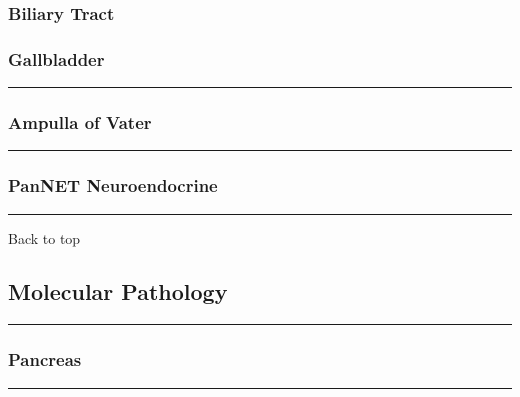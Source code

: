 \documentclass[]{article}
\begin{document}
\hypertarget{biliary-tract-1}{%
\subsubsection{Biliary Tract}\label{biliary-tract-1}}

\hypertarget{gallbladder-1}{%
\subsubsection{Gallbladder}\label{gallbladder-1}}

\begin{center}\rule{0.5\linewidth}{\linethickness}\end{center}

\hypertarget{ampulla-of-vater-1}{%
\subsubsection{Ampulla of Vater}\label{ampulla-of-vater-1}}

\begin{center}\rule{0.5\linewidth}{\linethickness}\end{center}

\hypertarget{pannet-neuroendocrine-1}{%
\subsubsection{PanNET Neuroendocrine}\label{pannet-neuroendocrine-1}}

\begin{center}\rule{0.5\linewidth}{\linethickness}\end{center}

Back to top

\pagebreak

\hypertarget{molecular-pathology}{%
\subsection{Molecular Pathology}\label{molecular-pathology}}

\begin{center}\rule{0.5\linewidth}{\linethickness}\end{center}

\hypertarget{pancreas-2}{%
\subsubsection{Pancreas}\label{pancreas-2}}

\begin{center}\rule{0.5\linewidth}{\linethickness}\end{center}
\end{document}
